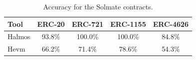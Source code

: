 \begin{table}[htb]
\centering
\begin{scriptsize}
\begin{tabular}{lcccc}
\toprule
\textbf{Tool} & \textbf{ERC-20} & \textbf{ERC-721} & \textbf{ERC-1155} & \textbf{ERC-4626} \\
\midrule
Halmos & 93.8\% & 100.0\% & 100.0\% & 84.8\% \\
Hevm & 66.2\% & 71.4\% & 78.6\% & 54.3\% \\
\bottomrule
\end{tabular}
\end{scriptsize}
\caption{Accuracy for the Solmate contracts.}
\label{tab:tool_accuracy_solmate}
\end{table}
